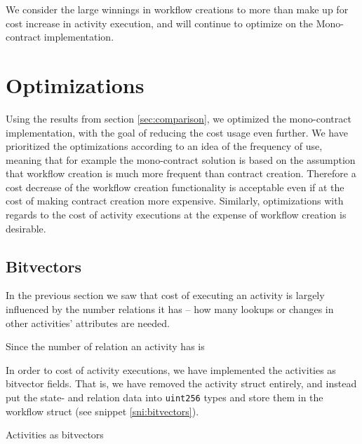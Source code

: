 \documentclass{article}
\begin{document}
	We consider the large winnings in workflow creations to more than make up for cost increase in activity execution, and will continue to optimize on the Mono-contract implementation.

		 



	\section{Optimizations}
		Using the results from section \ref{sec:comparison}, we optimized the mono-contract implementation, with the goal of reducing the cost usage even further.
		We have prioritized the optimizations according to an idea of the frequency of use, meaning that for example the mono-contract solution is based on the assumption that workflow creation is much more frequent than contract creation.
		Therefore a cost decrease of the workflow creation functionality is acceptable even if at the cost of making contract creation more expensive. 
		Similarly, optimizations with regards to the cost of activity executions at the expense of workflow creation is desirable.

		\subsection{Bitvectors}
		In the previous section we saw that cost of executing an activity is largely influenced by the number relations it has -- how many lookups or changes in other activities' attributes are needed.

		Since the number of relation an activity has is 

		In order to  cost of activity executions, we have implemented the activities as bitvector fields. 
		That is, we have removed the activity struct entirely, and instead put the state- and relation data into \texttt{uint256} types and store them in the workflow struct (see snippet \ref{sni:bitvectors}).
		
		\begin{snippet}[ht!]
			\centering
			
		 	\caption[Activities as bitvectors]
		 	{Activities as bitvectors}
		 	\label{sni:bitvectors}
		\end{snippet}
\end{document}
